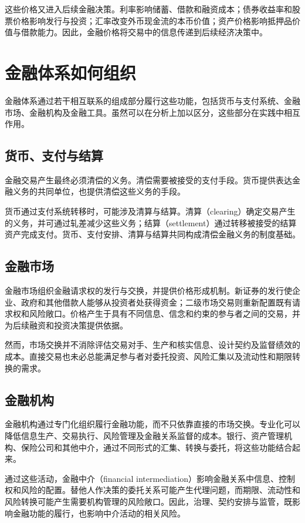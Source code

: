 这些价格又进入后续金融决策。利率影响储蓄、借款和融资成本；债券收益率和股票价格影响发行与投资；汇率改变外币现金流的本币价值；资产价格影响抵押品价值与借款能力。因此，金融价格将交易中的信息传递到后续经济决策中。

\section{金融体系如何组织}

金融体系通过若干相互联系的组成部分履行这些功能，包括货币与支付系统、金融市场、金融机构及金融工具。虽然可以在分析上加以区分，这些部分在实践中相互作用。

\subsection{货币、支付与结算}

金融交易产生最终必须清偿的义务。清偿需要被接受的支付手段。货币提供表达金融义务的共同单位，也提供清偿这些义务的手段。

货币通过支付系统转移时，可能涉及清算与结算。清算（clearing）确定交易产生的义务，并可通过轧差减少这些义务；结算（settlement）通过转移被接受的结算资产完成支付。货币、支付安排、清算与结算共同构成清偿金融义务的制度基础。

\subsection{金融市场}

金融市场组织金融请求权的发行与交换，并提供价格形成机制。新证券的发行使企业、政府和其他借款人能够从投资者处获得资金；二级市场交易则重新配置既有请求权和风险敞口。价格产生于具有不同信息、信念和约束的参与者之间的交易，并为后续融资和投资决策提供依据。

然而，市场交换并不消除评估交易对手、生产和核实信息、设计契约及监督绩效的成本。直接交易也未必总能满足参与者对委托投资、风险汇集以及流动性和期限转换的需求。

\subsection{金融机构}

金融机构通过专门化组织履行金融功能，而不只依靠直接的市场交换。专业化可以降低信息生产、交易执行、风险管理及金融关系监督的成本。银行、资产管理机构、保险公司和其他中介，通过不同形式的汇集、转换与委托，将这些功能结合起来。

通过这些活动，金融中介（financial intermediation）影响金融关系中信息、控制权和风险的配置。替他人作决策的委托关系可能产生代理问题，而期限、流动性和风险转换可能产生需要机构管理的风险敞口。因此，治理、契约安排与监管，既影响金融功能的履行，也影响中介活动的相关风险。

